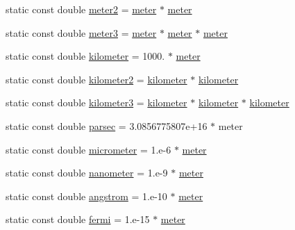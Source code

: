 \begin{DoxyCompactItemize}
static const double \hyperlink{namespacedd4hep_afe718b0d811af6b4d45c556e3a0e87a3}{meter2} = \hyperlink{namespacedd4hep_a46f5cf0231796af4296a307a58812b06}{meter} $\ast$ \hyperlink{namespacedd4hep_a46f5cf0231796af4296a307a58812b06}{meter}
\item 
static const double \hyperlink{namespacedd4hep_a4f771b88b1ff2018c0dacd3a1b56023b}{meter3} = \hyperlink{namespacedd4hep_a46f5cf0231796af4296a307a58812b06}{meter} $\ast$ \hyperlink{namespacedd4hep_a46f5cf0231796af4296a307a58812b06}{meter} $\ast$ \hyperlink{namespacedd4hep_a46f5cf0231796af4296a307a58812b06}{meter}
\item 
static const double \hyperlink{namespacedd4hep_a689bd0289c6c83e392d385bc870a34ab}{kilometer} = 1000. $\ast$ \hyperlink{namespacedd4hep_a46f5cf0231796af4296a307a58812b06}{meter}
\item 
static const double \hyperlink{namespacedd4hep_a61bb5393f7b8ec3694cb8e522145695f}{kilometer2} = \hyperlink{namespacedd4hep_a689bd0289c6c83e392d385bc870a34ab}{kilometer} $\ast$ \hyperlink{namespacedd4hep_a689bd0289c6c83e392d385bc870a34ab}{kilometer}
\item 
static const double \hyperlink{namespacedd4hep_a4501dea229a9ace2c46c427c69ddb5aa}{kilometer3} = \hyperlink{namespacedd4hep_a689bd0289c6c83e392d385bc870a34ab}{kilometer} $\ast$ \hyperlink{namespacedd4hep_a689bd0289c6c83e392d385bc870a34ab}{kilometer} $\ast$ \hyperlink{namespacedd4hep_a689bd0289c6c83e392d385bc870a34ab}{kilometer}
\item 
static const double \hyperlink{namespacedd4hep_a6d097c8b8fee88c7f77ebdfe2923ac45}{parsec} = 3.0856775807e+16 $\ast$ meter
\item 
static const double \hyperlink{namespacedd4hep_ae1c0791e549db4ff640f02a54c2e4e11}{micrometer} = 1.e-\/6 $\ast$ \hyperlink{namespacedd4hep_a46f5cf0231796af4296a307a58812b06}{meter}
\item 
static const double \hyperlink{namespacedd4hep_af784647fab76654e26b09a341d3f9210}{nanometer} = 1.e-\/9 $\ast$ \hyperlink{namespacedd4hep_a46f5cf0231796af4296a307a58812b06}{meter}
\item 
static const double \hyperlink{namespacedd4hep_a82387b0906ee031cb7ef93723f99c474}{angstrom} = 1.e-\/10 $\ast$ \hyperlink{namespacedd4hep_a46f5cf0231796af4296a307a58812b06}{meter}
\item 
static const double \hyperlink{namespacedd4hep_ab70812b84cbdb9ab6090547c4b237abb}{fermi} = 1.e-\/15 $\ast$ \hyperlink{namespacedd4hep_a46f5cf0231796af4296a307a58812b06}{meter}
\item 

\end{DoxyCompactItemize}
